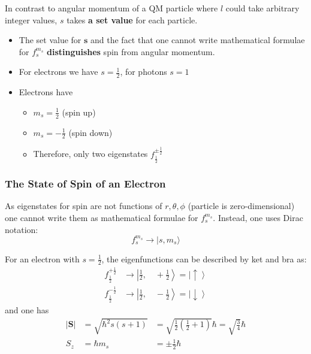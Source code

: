 
In contrast to angular momentum of a QM particle where $l$ could take arbitrary integer values, $s$ takes \textbf{a set value} for each particle.


\begin{itemize}
    \item The set value for $\mathbf{s}$ and the fact that one cannot write mathematical formulae for $f_{s}^{m_s}$ \textbf{distinguishes} spin from angular momentum.
    \item For electrons we have $s=\frac{1}{2}$, for photons $s=1$
    \item Electrons have
          \begin{itemize}
              \item $m_s=\frac{1}{2}$ (spin up)
              \item $m_s=-\frac{1}{2}$ (spin down)
              \item Therefore, only two eigenstates $f_{\frac{1}{2}}^{\pm \frac{1}{2}}$
          \end{itemize}
\end{itemize}

\subsubsection{The State of Spin of an Electron}
As eigenstates for spin are not functions of $r,\theta, \phi$ (particle is zero-dimensional) one cannot write them as mathematical formulae for $f_{s}^{m_s}$. Instead, one uses Dirac notation:
\begin{equation*}
    f_{s}^{m_{s}}\rightarrow|s,m_{s}\rangle
\end{equation*}


For an electron with $s=\frac{1}{2}$, the eigenfunctions can be described by ket and bra as:
\begin{align*}
    f_{\frac{1}{2}}^{+\frac{1}{2}} & \rightarrow\left|\frac{1}{2},\quad +\frac{1}{2}\right>= \left|\uparrow\right>   \\
    f_{\frac{1}{2}}^{-\frac{1}{2}} & \rightarrow\left|\frac{1}{2},\quad-\frac{1}{2}\right> = \left|\downarrow\right>
\end{align*}
and one has
\begin{align*}
    |\mathbf{S}| & =\sqrt{\hbar^2 s(s+1)} & =\sqrt{\frac{1}{2}\left(\frac{1}{2}+1\right)}\hbar=\sqrt{\frac{3}{4}}\hbar \\
    S_z          & =\hbar m_s             & =\pm \frac{1}{2}\hbar
\end{align*}

